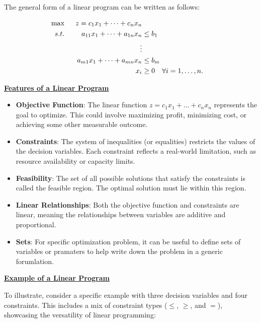 \medskip The general form of a linear program can be written as follows:

\begin{equation}
\begin{aligned}
\max\;\;&& z = c_1x_1 + \dots + c_nx_n \\
s.t.\;\;&& a_{11}x_1 + \dots + a_{1n}x_n &\leq b_1 \\
&& \hspace*{0.5in}\vdots \\
&& a_{m1}x_1 + \dots + a_{mn}x_n &\leq b_m \\
&& x_i &\geq 0 \quad \forall i=1, \dots, n.
\end{aligned}
\label{eqn:GeneralLPMax}
\end{equation}

\medskip \underline{\bf Features of a Linear Program}

\begin{itemize}
    \item \textbf{Objective Function}: The linear function $z = c_1x_1 + \dots + c_nx_n$ represents the goal to optimize. This could involve maximizing profit, minimizing cost, or achieving some other measurable outcome.
    \item \textbf{Constraints}: The system of inequalities (or equalities) restricts the values of the decision variables. Each constraint reflects a real-world limitation, such as resource availability or capacity limits.
    \item \textbf{Feasibility}: The set of all possible solutions that satisfy the constraints is called the feasible region. The optimal solution must lie within this region.
    \item \textbf{Linear Relationships}: Both the objective function and constraints are linear, meaning the relationships between variables are additive and proportional.
       \item \textbf{Sets}: For specific optimization problem, it can be useful to define sets of variables or pramaters to help write down the problem in a generic forumlation.
\end{itemize}

\bigskip 

\underline{\bf Example of a Linear Program}

To illustrate, consider a specific example with three decision variables and four constraints. This includes a mix of constraint types ($\leq$, $\geq$, and $=$), showcasing the versatility of linear programming:

